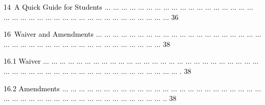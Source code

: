 \documentclass[12pt]{article}
\begin{document}
\vspace{\baselineskip}
{\fontsize{7pt}{8.4pt}\selectfont \textcolor[HTML]{00000A}{14\ A Quick Guide for Students $ \ldots $ $ \ldots $ $ \ldots $ $ \ldots $ $ \ldots $ $ \ldots $ $ \ldots $ $ \ldots $ $ \ldots $ $ \ldots $ $ \ldots $ $ \ldots $ $ \ldots $ $ \ldots $ $ \ldots $ $ \ldots $ $ \ldots $ $ \ldots $ $ \ldots $ $ \ldots $ $ \ldots $ $ \ldots $ $ \ldots $ $ \ldots $ $ \ldots $ $ \ldots $ $ \ldots $ $ \ldots $ $ \ldots $ $ \ldots $ $ \ldots $ $ \ldots $ $ \ldots $ $ \ldots $ $ \ldots $ $ \ldots $ $ \ldots $ $ \ldots $   36}\par}\par


\vspace{\baselineskip}
{\fontsize{7pt}{8.4pt}\selectfont \textcolor[HTML]{00000A}{16\ Waiver and Amendments $ \ldots $ $ \ldots $ $ \ldots $ $ \ldots $ $ \ldots $ $ \ldots $ $ \ldots $ $ \ldots $ $ \ldots $ $ \ldots $ $ \ldots $ $ \ldots $ $ \ldots $ $ \ldots $ $ \ldots $ $ \ldots $ $ \ldots $ $ \ldots $ $ \ldots $ $ \ldots $ $ \ldots $ $ \ldots $ $ \ldots $ $ \ldots $ $ \ldots $ $ \ldots $ $ \ldots $ $ \ldots $ $ \ldots $ $ \ldots $ $ \ldots $ $ \ldots $ $ \ldots $ $ \ldots $ $ \ldots $ $ \ldots $ $ \ldots $ $ \ldots $ $ \ldots $   38}\par}\par


\vspace{\baselineskip}
\begin{adjustwidth}{0.21in}{0.0in}
{\fontsize{7pt}{8.4pt}\selectfont \textcolor[HTML]{00000A}{16.1 Waiver $ \ldots $ $ \ldots $ $ \ldots $ $ \ldots $ $ \ldots $ $ \ldots $ $ \ldots $ $ \ldots $ $ \ldots $ $ \ldots $ $ \ldots $ $ \ldots $ $ \ldots $ $ \ldots $ $ \ldots $ $ \ldots $ $ \ldots $ $ \ldots $ $ \ldots $ $ \ldots $ $ \ldots $ $ \ldots $ $ \ldots $ $ \ldots $ $ \ldots $ $ \ldots $ $ \ldots $ $ \ldots $ $ \ldots $ $ \ldots $ $ \ldots $ $ \ldots $ $ \ldots $ $ \ldots $ $ \ldots $ $ \ldots $ $ \ldots $ $ \ldots $ $ \ldots $ $ \ldots $ $ \ldots $ $ \ldots $ $ \ldots $ $ \ldots $ $ \ldots $ $ \ldots $ $ \ldots $ . 38}\par}\par

\end{adjustwidth}


\vspace{\baselineskip}
\begin{adjustwidth}{0.21in}{0.0in}
{\fontsize{7pt}{8.4pt}\selectfont \textcolor[HTML]{00000A}{16.2 Amendments $ \ldots $ $ \ldots $ $ \ldots $ $ \ldots $ $ \ldots $ $ \ldots $ $ \ldots $ $ \ldots $ $ \ldots $ $ \ldots $ $ \ldots $ $ \ldots $ $ \ldots $ $ \ldots $ $ \ldots $ $ \ldots $ $ \ldots $ $ \ldots $ $ \ldots $ $ \ldots $ $ \ldots $ $ \ldots $ $ \ldots $ $ \ldots $ $ \ldots $ $ \ldots $ $ \ldots $ $ \ldots $ $ \ldots $ $ \ldots $ $ \ldots $ $ \ldots $ $ \ldots $ $ \ldots $ $ \ldots $ $ \ldots $ $ \ldots $ $ \ldots $ $ \ldots $ $ \ldots $ $ \ldots $ $ \ldots $ $ \ldots $ .. 38}\par}\par

\end{adjustwidth}
\end{document}

